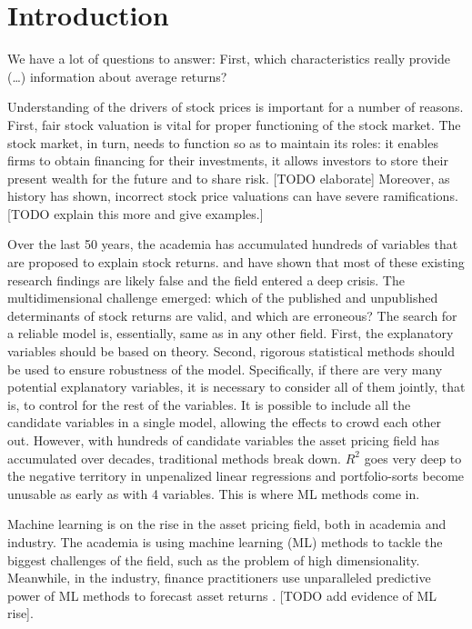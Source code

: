 \chapter{Introduction}
\label{chap:int}

\setlength{\epigraphwidth}{0.8\textwidth}
\epigraph{We have a lot of questions to answer: First, which characteristics really provide (\ldots) information about average returns?}{\cite{cochrane2011presidential}}

Understanding of the drivers of stock prices is important for a number of reasons. First, fair stock valuation is vital for proper functioning of the stock market. The stock market, in turn, needs to function so as to maintain its roles: it enables firms to obtain financing for their investments, it allows investors to store their present wealth for the future and to share risk. [TODO elaborate] Moreover, as history has shown, incorrect stock price valuations can have severe ramifications. [TODO explain this more and give examples.]

Over the last 50 years, the academia has accumulated hundreds of variables that are proposed to explain stock returns. \cite{harvey2016and} and \cite{mclean2016does} have shown that most of these existing research findings are likely false and the field entered a deep crisis. The multidimensional challenge \citep{cochrane2011presidential} emerged: which of the published and unpublished determinants of stock returns are valid, and which are erroneous? The search for a reliable model is, essentially, same as in any other field. First, the explanatory variables should be based on theory. Second, rigorous statistical methods should be used to ensure robustness of the model. Specifically, if there are very many potential explanatory variables, it is necessary to consider all of them jointly, that is, to control for the rest of the variables. It is possible to include all the candidate variables in a single model, allowing the effects to crowd each other out. However, with hundreds of candidate variables the asset pricing field has accumulated over decades, traditional methods break down. $R^2$ goes very deep to the negative territory in unpenalized linear regressions \citep{gu2020empirical} and portfolio-sorts become unusable as early as with 4 variables. This is where ML methods come in. 

Machine learning is on the rise in the asset pricing field, both in academia and industry. The academia is using machine learning (ML) methods to tackle the biggest challenges of the field, such as the problem of high dimensionality. Meanwhile, in the industry, finance practitioners use unparalleled predictive power of ML methods to forecast asset returns \citep{gu2020empirical}. [TODO add evidence of ML rise].    

